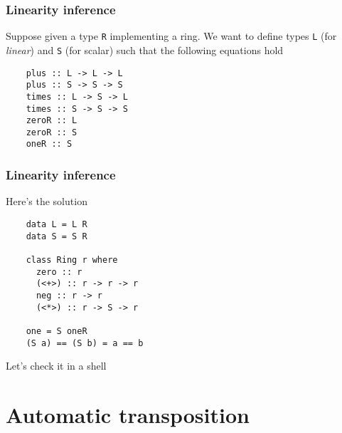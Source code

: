 \documentclass[10pt]{beamer}
\begin{document}

\begin{frame}[fragile]
  \frametitle{Linearity inference}

  \begin{center}
    Suppose given a type \lstinline{R} implementing a ring. We want to
    define types \lstinline{L} (for \emph{linear}) and \lstinline{S}
    (for scalar) such that the following equations hold
  \end{center}

  \begin{lstlisting}
    plus :: L -> L -> L
    plus :: S -> S -> S
    times :: L -> S -> L
    times :: S -> S -> S
    zeroR :: L
    zeroR :: S
    oneR :: S
  \end{lstlisting}
\end{frame}  

\begin{frame}[fragile]
  \frametitle{Linearity inference}
  
  \begin{center}
    Here's the solution    
  \end{center}

  \begin{lstlisting}
    data L = L R
    data S = S R
    
    class Ring r where
      zero :: r
      (<+>) :: r -> r -> r
      neg :: r -> r
      (<*>) :: r -> S -> r

    one = S oneR
    (S a) == (S b) = a == b
  \end{lstlisting}

  \begin{center}
    Let's check it in a shell
  \end{center}
\end{frame}


\section{Automatic transposition}

\lstset{language=python}
\end{document}
